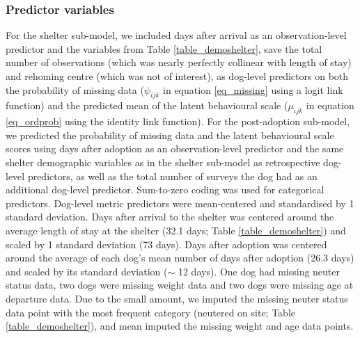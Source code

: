 \documentclass[12pt]{article}
\begin{document}
\subsubsection{Predictor variables}
For the shelter sub-model, we included days after arrival as an observation-level predictor and the variables from Table \ref{table_demoshelter}, save the total number of observations (which was nearly perfectly collinear with length of stay) and rehoming centre (which was not of interest), as dog-level predictors on both the probability of missing data ($\psi_{ijk}$ in equation \ref{eq_missing} using a logit link function) and the predicted mean of the latent behavioural scale ($\mu_{ijk}$ in equation \ref{eq_ordprob} using the identity link function). For the post-adoption sub-model, we predicted the probability of missing data and the latent behavioural scale scores using days after adoption as an observation-level predictor and the same shelter demographic variables as in the shelter sub-model as retrospective dog-level predictors, as well as the total number of surveys the dog had as an additional dog-level predictor. Sum-to-zero coding was used for categorical predictors. Dog-level metric predictors were mean-centered and standardised by 1 standard deviation. Days after arrival to the shelter was centered around the average length of stay at the shelter (32.1 days; Table \ref{table_demoshelter}) and scaled by 1 standard deviation (73 days). Days after adoption was centered around the average of each dog's mean number of days after adoption (26.3 days) and scaled by its standard deviation ($\sim$ 12 days). One dog had missing neuter status data, two dogs were missing weight data and two dogs were missing age at departure data. Due to the small amount, we imputed the missing neuter status data point with the most frequent category (neutered on site; Table \ref{table_demoshelter}), and mean imputed the missing weight and age data points.
\end{document}
